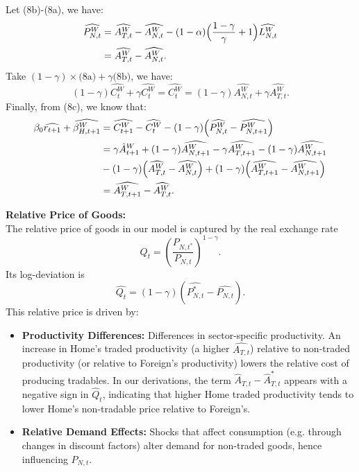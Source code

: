 \documentclass[a4paper,12pt]{article} %
\theoremstyle{nonitalic}
\begin{document}
Let (8b)-(8a), we have:
\begin{align*}
     \widehat{P_{N,t}^W} &=  \widehat{A_{T,t}^W} -  \widehat{A_{N,t}^W} - (1-\alpha)\Bigl(\frac{1-\gamma}{\gamma} + 1\Bigr)  \widehat{L_{N,t}^W} \\
    &=  \widehat{A_{T,t}^W} -  \widehat{A_{N,t}^W}.
\end{align*}
Take $(1-\gamma) \times \text{(8a)} + \gamma \text{(8b)}$, we have:
\[
(1-\gamma)  \widehat{C_t^W} + \gamma  \widehat{C_t^W} =  \widehat{C_t^W} = (1-\gamma)  \widehat{A_{N,t}^W} + \gamma  \widehat{A_{T,t}^W}.
\]
Finally, from (8c), we know that:
\begin{align*}
    \beta_0  \widehat{r_{t+1}} + \widehat{\beta_{H, t+1}^W} &=  \widehat{C_{t+1}^W} -  \widehat{C_t^W} - (1-\gamma)\Bigl( \widehat{P_{N,t}^W} - \widehat{P_{N, t+1}^W}\Bigr) \\
    &= \gamma \hat{A}_{t+1}^W + (1-\gamma)  \widehat{A_{N,t+1}^W} - \gamma  \widehat{A_{T,t+1}^W} - (1-\gamma)  \widehat{A_{N,t+1}^W} \\
    \quad \quad &- (1-\gamma)\Bigl( \widehat{A_{T,t}^W} -  \widehat{A_{N,t}^W}\Bigr) + (1-\gamma) \Bigl( \widehat{A_{T,t+1}^W} - \widehat{A_{N, t+1}^W} \Bigr) \\
    &= \widehat{A_{T, t+1}^W} -  \widehat{A_{T,t}^W}.
\end{align*}

\textbf{Relative Price of Goods:}\\
The relative price of goods in our model is captured by the real exchange rate
\[
Q_t = \left(\frac{P_{N,t^*}}{P_{N,t}}\right)^{1-\gamma}.
\]
Its log-deviation is
\[
\widehat{Q_t} = (1-\gamma)(\widehat{P_{N,t}^*}-\widehat{P_{N,t}}).
\]
This relative price is driven by:
\begin{itemize}
    \item \textbf{Productivity Differences:} Differences in sector-specific productivity. An increase in Home's traded productivity (a higher \( \widehat{A_{T,t}} \)) relative to non-traded productivity (or relative to Foreign's productivity) lowers the relative cost of producing tradables. In our derivations, the term \( \widehat{A}_{T,t} - \widehat{A}^*_{T,t} \) appears with a negative sign in \( \widehat{Q}_t \), indicating that higher Home traded productivity tends to lower Home's non-tradable price relative to Foreign's.
    \item \textbf{Relative Demand Effects:} Shocks that affect consumption (e.g. through changes in discount factors) alter demand for non-traded goods, hence influencing \( P_{N,t} \).
\end{itemize}
\end{document}
